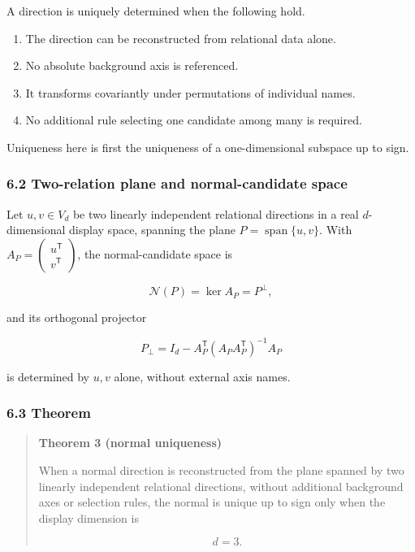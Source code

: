 \documentclass[
  a4paper,
]{article}
\providecommand{\tightlist}{%
  \setlength{\itemsep}{0pt}\setlength{\parskip}{0pt}}
\begin{document}
A direction is uniquely determined when the following hold.

\begin{enumerate}
\def\labelenumi{\arabic{enumi}.}
\tightlist
\item
  The direction can be reconstructed from relational data alone.
\item
  No absolute background axis is referenced.
\item
  It transforms covariantly under permutations of individual names.
\item
  No additional rule selecting one candidate among many is required.
\end{enumerate}

Uniqueness here is first the uniqueness of a one-dimensional subspace up
to sign.

\subsubsection{6.2 Two-relation plane and normal-candidate
space}\label{two-relation-plane-and-normal-candidate-space}

Let \(u,v\in V_d\) be two linearly independent relational directions in
a real \(d\)-dimensional display space, spanning the plane
\(P=\operatorname{span}\{u,v\}\). With
\(A_P=\begin{pmatrix}u^{\mathsf T}\\ v^{\mathsf T}\end{pmatrix}\), the
normal-candidate space is

\[
\mathcal N(P)=\ker A_P=P^\perp,
\]

and its orthogonal projector

\[
P_\perp=I_d-A_P^{\mathsf T}\left(A_PA_P^{\mathsf T}\right)^{-1}A_P
\]

is determined by \(u,v\) alone, without external axis names.

\subsubsection{6.3 Theorem}\label{theorem-2}

\begin{quote}
\textbf{Theorem 3 (normal uniqueness)}

When a normal direction is reconstructed from the plane spanned by two
linearly independent relational directions, without additional
background axes or selection rules, the normal is unique up to sign only
when the display dimension is

\[
d=3.
\]
\end{quote}
\end{document}
